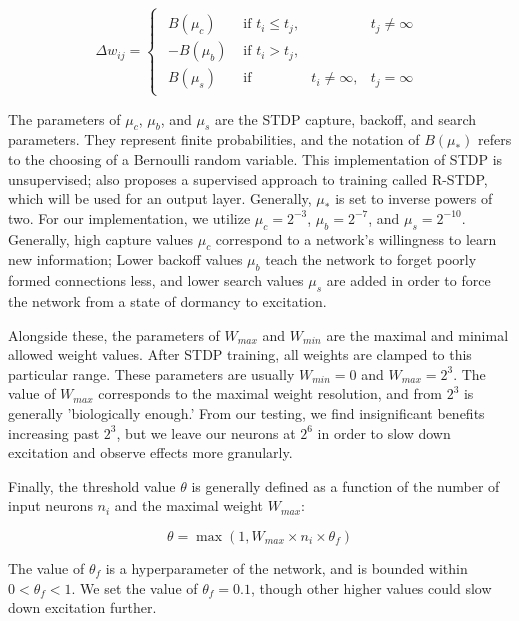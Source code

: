 $$
    \Delta w_{ij} = \begin{cases}
        \begin{matrix}
            B(\mu_c)  & \text{ if } t_i\leq t_j, &                 & t_j\neq\infty \\
            -B(\mu_b) & \text{ if } t_i > t_j,   &                 &               \\
            B(\mu_s)  & \text{ if }              & t_i\neq \infty, & t_j=\infty
        \end{matrix}
    \end{cases}
$$

The parameters of $\mu_c$, $\mu_b$, and $\mu_s$ are the STDP capture, backoff,
and search parameters. They represent finite probabilities, and the notation of
$B(\mu_*)$ refers to the choosing of a Bernoulli random variable. This
implementation of STDP is unsupervised; \cite{TNN} also proposes a supervised
approach to training called R-STDP, which will be used for an output layer.
Generally, $\mu_*$ is set to inverse powers of two. For our implementation, we
utilize $\mu_c = 2^{-3}$, $\mu_b = 2^{-7}$, and $\mu_s = 2^{-10}$. Generally,
high capture values $\mu_c$ correspond to a network's willingness to learn new
information; Lower backoff values $\mu_b$ teach the network to forget poorly
formed connections less, and lower search values $\mu_s$ are added in order to
force the network from a state of dormancy to excitation.

Alongside these, the parameters of $W_{max}$ and $W_{min}$ are the maximal and
minimal allowed weight values. After STDP training, all weights are clamped to
this particular range. These parameters are usually $W_{min} = 0$ and
$W_{max} = 2^3$. The value of $W_{max}$ corresponds to the maximal weight
resolution, and from \cite{TNN} $2^3$ is generally 'biologically enough.' From
our testing, we find insignificant benefits increasing past $2^3$, but we leave
our neurons at $2^6$ in order to slow down excitation and observe effects more
granularly.

Finally, the threshold value $\theta$ is generally defined as a function of the
number of input neurons $n_i$ and the maximal weight $W_{max}$:

$$
    \theta = \max(1, W_{max} \times n_i \times \theta_f)
$$

The value of $\theta_f$ is a hyperparameter of the network, and is bounded
within $0 < \theta_f < 1$. We set the value of $\theta_f = 0.1$, though other
higher values could slow down excitation further.

